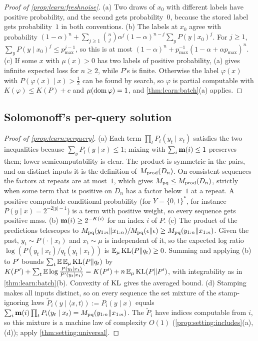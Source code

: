 \begin{proof}[Proof of \cref{prop:learn:freshnoise}]
(a) Two draws of $x_0$ with different labels have positive probability, and the second gets probability~$0$, because the stored label gets probability~$1$ in both conventions. (b) The labels at $x_0$ agree with probability $(1-\alpha)^n+\sum_{j\ge1}\binom nj\alpha^j(1-\alpha)^{n-j}\sum_yP(y\mid x_0)^j$. For $j\ge1$, $\sum_yP(y\mid x_0)^j\le p_{\max}^{j-1}$, so this is at most $(1-\alpha)^n+p_{\max}^{-1}(1-\alpha+\alpha p_{\max})^n$. (c) If some $x$ with $\mu(x)>0$ has two labels of positive probability, (a) gives infinite expected loss for $n\ge2$, while $P$'s is finite. Otherwise the label $\varphi(x)$ with $P(\varphi(x)\mid x)>\frac12$ can be found by search, so $\varphi$ is partial computable with $K(\varphi)\le K(P)+c$ and $\mu(\operatorname{dom}\varphi)=1$, and \cref{thm:learn:batch}(a) applies.
\end{proof}

\subsection{Solomonoff's per-query solution}\label{app:learn:perquery}

\begin{proof}[Proof of \cref{prop:learn:perquery}]
(a) Each term $\prod_tP_i(y_t\mid x_t)$ satisfies the two inequalities because $\sum_yP_i(y\mid x)\le1$; mixing with $\sum_i\mathbf{m}(i)\le1$ preserves them; lower semicomputability is clear. The product is symmetric in the pairs, and on distinct inputs it is the definition of $M_{\mathrm{prod}}(D_n)$. On consistent sequences the factors at repeats are at most~$1$, which gives $M_{\mathrm{pq}}\le M_{\mathrm{prod}}(D_n)$, strictly when some term that is positive on $D_n$ has a factor below~$1$ at a repeat. A positive computable conditional probability (for $Y=\{0,1\}^*$, for instance $P(y\mid x)=2^{-2|y|-1}$) is a term with positive weight, so every sequence gets positive mass.
(b) $\mathbf{m}(i)\ge2^{-K(i)}$ for an index $i$ of $P$.
(c) The product of the predictions telescopes to $M_{\mathrm{pq}}(y_{1:n}\Vert x_{1:n})/M_{\mathrm{pq}}(\epsilon\Vert\epsilon)\ge M_{\mathrm{pq}}(y_{1:n}\Vert x_{1:n})$. Given the past, $y_t\sim P(\cdot\mid x_t)$ and $x_t\sim\mu$ is independent of it, so the expected log ratio $\log(P(y_t\mid x_t)/q_t(y_t\mid x_t))$ is $\mathbb{E}_\mu\operatorname{KL}(P\|q_t)\ge0$. Summing and applying (b) to $P'$ bounds $\sum_t\mathbb{E}\,\mathbb{E}_\mu\operatorname{KL}(P\|q_t)$ by $K(P')+\sum_t\mathbb{E}\log\frac{P(y_t\mid x_t)}{P'(y_t\mid x_t)}=K(P')+n\,\mathbb{E}_\mu\operatorname{KL}(P\|P')$, with integrability as in \cref{thm:learn:batch}(b). Convexity of $\operatorname{KL}$ gives the averaged bound.
(d) Stamping makes all inputs distinct, so on every sequence the set mixture of the stamp-ignoring laws $\tilde P_i(y\mid\langle x,t\rangle):=P_i(y\mid x)$ equals $\sum_i\mathbf{m}(i)\prod_tP_i(y_t\mid x_t)=M_{\mathrm{pq}}(y_{1:n}\Vert x_{1:n})$. The $\tilde P_i$ have indices computable from $i$, so this mixture is a machine law of complexity $O(1)$ (\cref{prop:setting:includes}(a),(d)); apply \cref{thm:setting:universal}.
\end{proof}

